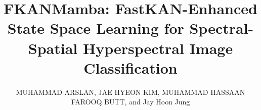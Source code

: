 \documentclass{ieeeaccess}
\begin{document}
\title{FKANMamba: FastKAN-Enhanced State Space Learning for Spectral-Spatial Hyperspectral Image Classification}
\author{\uppercase{Muhammad Arslan},
\uppercase{Jae Hyeon Kim, Muhammad Hassaan Farooq Butt}, and Jay Hoon Jung}
\address[1]{Department of Computer Engineering, Korea Aerospace University, Gyeonggi-do 10540,  Republic of Korea (e-mail: arslan@kau.ac.kr)}
\address[2]{Faculty of Environmental Sciences and Natural Resource Management (MINA), Norwegian University of Life Sciences (NMBU), 1432 Ås, Norway (e-mail: mubut0522@nmbu.no)}

\end{document}
